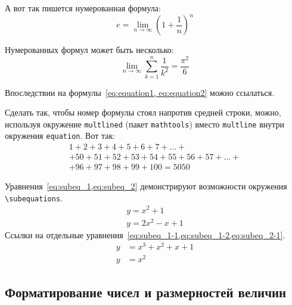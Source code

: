 А вот так пишется нумерованная формула:
\begin{equation}
  \label{eq:equation1}
  e = \lim_{n \to \infty} \left( 1+\frac{1}{n} \right) ^n
\end{equation}

Нумерованных формул может быть несколько:
\begin{equation}
  \label{eq:equation2}
  \lim_{n \to \infty} \sum_{k=1}^n \frac{1}{k^2} = \frac{\pi^2}{6}
\end{equation}

Впоследствии на формулы~\cref{eq:equation1, eq:equation2} можно ссылаться.

Сделать так, чтобы номер формулы стоял напротив средней строки, можно,
используя окружение \verb|multlined| (пакет \verb|mathtools|) вместо
\verb|multline| внутри окружения \verb|equation|. Вот так:
\begin{equation} %
  \label{eq:equation3}
    \begin{multlined}
        1+ 2+3+4+5+6+7+\dots + \\
        + 50+51+52+53+54+55+56+57 + \dots + \\
        + 96+97+98+99+100=5050
    \end{multlined}
\end{equation}

Уравнения~\cref{eq:subeq_1,eq:subeq_2} демонстрируют возможности
окружения \verb|\subequations|.
\begin{subequations}
    \label{eq:subeq_1}
    \begin{gather}
        y = x^2 + 1 \label{eq:subeq_1-1} \\
        y = 2 x^2 - x + 1 \label{eq:subeq_1-2}
    \end{gather}
\end{subequations}
Ссылки на отдельные уравнения~\cref{eq:subeq_1-1,eq:subeq_1-2,eq:subeq_2-1}.
\begin{subequations}
    \label{eq:subeq_2}
    \begin{align}
        y &= x^3 + x^2 + x + 1 \label{eq:subeq_2-1} \\
        y &= x^2
    \end{align}
\end{subequations}

\subsection{Форматирование чисел и размерностей величин}\label{sec:units}


